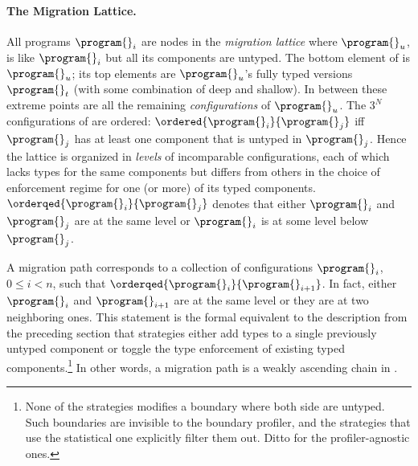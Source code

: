 \paragraph{The Migration Lattice.}  All programs $\program{}_i$ are nodes in the
\emph{migration lattice}  where ${\program{}_u}$, is like
${\program{}_i}$ but all its components are untyped. The bottom element of
 is ${\program{}_u}$; its top elements are
${\program{}_u}$'s fully typed versions $\program{}_t$ (with some combination of
deep and shallow). In between these extreme points are all the remaining
\emph{configurations} of $\program{}_u$. The $3^N$ configurations of
 are ordered: $\ordered{\program{}_i}{\program{}_j}$ iff
$\program{}_j$ has at least one component that is untyped in
$\program{}_j$. Hence the lattice is organized in \emph{levels} of incomparable
configurations, each of which lacks types for the same components but differs
from others in the choice of enforcement regime for one (or more) of its typed
components.  $\orderqed{\program{}_i}{\program{}_j}$ denotes that either
$\program{}_i$ and $\program{}_j$ are at the same level or $\program{}_i$ is at
some level below $\program{}_j$.

A migration path corresponds to a collection of configurations $\program{}_i$,
$0 \leq i < n$, such that $\orderqed{\program{}_i}{\program{}_{i+1}}$. In fact,
either $\program{}_i$ and $\program{}_{i+1}$ are at the same level or they are
at two neighboring ones.  This statement is the formal equivalent to the
description from the preceding section that strategies either add types to a
single previously untyped component or toggle the type enforcement of existing
typed components.\footnote{None of the strategies modifies a boundary where both
side are untyped. Such boundaries are invisible to the boundary
profiler, and the strategies that use the statistical one explicitly filter them
out. Ditto for the profiler-agnostic ones.}  In other words, a migration path is
a weakly ascending chain in
.



